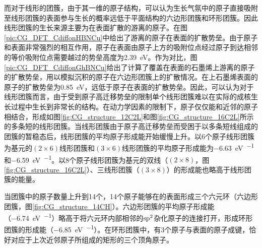     而对于线形的团簇，由于其一维的原子结构，可以认为生长气氛中的原子直接吸附至线形团簇的表面参与生长的概率远低于平面结构的六边形团簇和环形团簇。因此线形团簇的生长来源主要为在表面扩散的游离的原子。在图\ref{pic:CG_DFT_CdiffonHBNCu}中给出了游离的原子在表面的扩散势垒。由于原子和表面非常强烈的相互作用，原子在表面由原子上方的吸附位点经过原子到达相邻的等价吸附位点需要越过的势垒高度为\SI{2.39}{\electronvolt}。作为对比，图\ref{pic:CG_DFT_CdiffonGhBNCu}给出了计算了覆盖在表面的石墨烯上游离的原子的扩散势垒，用以模拟沉积的原子在六边形团簇上的扩散情况。在上石墨烯表面的原子的扩散势垒为\SI{0.85}{\electronvolt}，远低于原子在表面的扩散势垒。因此，可以认为对于线形团簇而言，由于受到原子高迁移势垒的限制单个线形团簇难以在实际的成核生长过程中生长到非常长的结构。在动力学因素的限制下，原子仅仅能和近邻的原子相结合，形成如图\ref{fig:CG_structure_12C2L}和图\ref{fig:CG_structure_16C2L}所示的多条短的线形团簇。当线形团簇由于原子高迁移势垒而受困于以多条短线组成的团簇的暂稳态后，线形团簇的平均原子形成能开始缓慢上升。以6个原子线形团簇为基元的$\left(2 \times 6\right)$线形团簇和$\left(3 \times 6\right)$线形团簇的平均原子形成能为\SI{-6.63}{\electronvolt\per\atom}和\SI{-6.59}{\electronvolt\per\atom}。以8个原子线形团簇为基元的双线（$\left(2 \times 8\right)$，图\ref{fig:CG_structure_16C2L}）、三线形团簇（$\left(3 \times 8\right)$）的形成能也略高于线形团簇的能量。
    
    当团簇中的原子数量上升到14个，14个原子能够在的表面形成三个六元环（六边形团簇，图\ref{fig:CG_structure_14CH}）。六边形团簇的平均原子形成能（\SI{-6.74}{\electronvolt\per\atom}）略高于将六元环内部相邻的$\rm sp^2$杂化原子的连接打开，形成环形团簇的形成能（\SI{-6.85}{\electronvolt\per\atom}）。在环形团簇中，有3个原子与表面的原子成键，恰好对应于上次近邻原子所组成的矩形的三个顶角原子。

